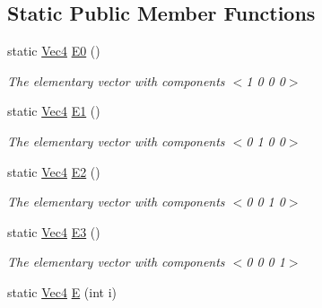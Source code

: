 \subsection*{Static Public Member Functions}
\begin{DoxyCompactItemize}
\item 
\hypertarget{classgofxmath_1_1_vec4_aefd7194e26e1992779bd8269ffd6ae92}{}static \hyperlink{classgofxmath_1_1_vec4}{Vec4} \hyperlink{classgofxmath_1_1_vec4_aefd7194e26e1992779bd8269ffd6ae92}{E0} ()\label{classgofxmath_1_1_vec4_aefd7194e26e1992779bd8269ffd6ae92}

\begin{DoxyCompactList}\small\item\em The elementary vector with components $<$1 0 0 0$>$ \end{DoxyCompactList}\item 
\hypertarget{classgofxmath_1_1_vec4_ae5c76b688aee3e7ec4baf7703bffd125}{}static \hyperlink{classgofxmath_1_1_vec4}{Vec4} \hyperlink{classgofxmath_1_1_vec4_ae5c76b688aee3e7ec4baf7703bffd125}{E1} ()\label{classgofxmath_1_1_vec4_ae5c76b688aee3e7ec4baf7703bffd125}

\begin{DoxyCompactList}\small\item\em The elementary vector with components $<$0 1 0 0$>$ \end{DoxyCompactList}\item 
\hypertarget{classgofxmath_1_1_vec4_a307a893693266de610b51aa86c96c33d}{}static \hyperlink{classgofxmath_1_1_vec4}{Vec4} \hyperlink{classgofxmath_1_1_vec4_a307a893693266de610b51aa86c96c33d}{E2} ()\label{classgofxmath_1_1_vec4_a307a893693266de610b51aa86c96c33d}

\begin{DoxyCompactList}\small\item\em The elementary vector with components $<$0 0 1 0$>$ \end{DoxyCompactList}\item 
\hypertarget{classgofxmath_1_1_vec4_a67acbcc0e2d66c97eb5e2a710fe0cb95}{}static \hyperlink{classgofxmath_1_1_vec4}{Vec4} \hyperlink{classgofxmath_1_1_vec4_a67acbcc0e2d66c97eb5e2a710fe0cb95}{E3} ()\label{classgofxmath_1_1_vec4_a67acbcc0e2d66c97eb5e2a710fe0cb95}

\begin{DoxyCompactList}\small\item\em The elementary vector with components $<$0 0 0 1$>$ \end{DoxyCompactList}\item 
\hypertarget{classgofxmath_1_1_vec4_afd0a874be5b5c84e805e2d3d43175058}{}static \hyperlink{classgofxmath_1_1_vec4}{Vec4} \hyperlink{classgofxmath_1_1_vec4_afd0a874be5b5c84e805e2d3d43175058}{E} (int i)\label{classgofxmath_1_1_vec4_afd0a874be5b5c84e805e2d3d43175058}


\end{DoxyCompactItemize}
